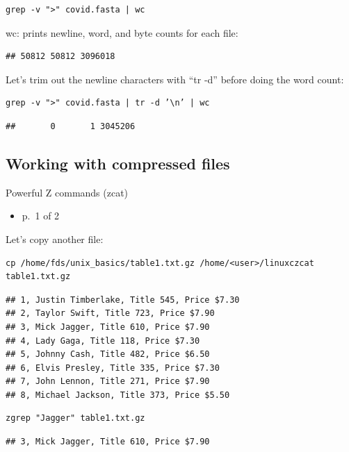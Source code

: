 \documentclass[
]{book}
\providecommand{\tightlist}{%
  \setlength{\itemsep}{0pt}\setlength{\parskip}{0pt}}
\begin{document}
\begin{verbatim}
grep -v ">" covid.fasta | wc
\end{verbatim}

wc: prints newline, word, and byte counts for each file:

\begin{verbatim}
## 50812 50812 3096018
\end{verbatim}

Let's trim out the newline characters with ``tr -d'' before doing the word count:

\begin{verbatim}
grep -v ">" covid.fasta | tr -d ’\n’ | wc
\end{verbatim}

\begin{verbatim}
##       0       1 3045206
\end{verbatim}

\hypertarget{working-with-compressed-files}{%
\subsection{Working with compressed files}\label{working-with-compressed-files}}

Powerful Z commands (zcat)

\begin{itemize}
\tightlist
\item
  p.~1 of 2
\end{itemize}

Let's copy another file:

\begin{verbatim}
cp /home/fds/unix_basics/table1.txt.gz /home/<user>/linuxczcat table1.txt.gz
\end{verbatim}

\begin{verbatim}
## 1, Justin Timberlake, Title 545, Price $7.30
## 2, Taylor Swift, Title 723, Price $7.90
## 3, Mick Jagger, Title 610, Price $7.90
## 4, Lady Gaga, Title 118, Price $7.30
## 5, Johnny Cash, Title 482, Price $6.50
## 6, Elvis Presley, Title 335, Price $7.30
## 7, John Lennon, Title 271, Price $7.90
## 8, Michael Jackson, Title 373, Price $5.50
\end{verbatim}

\begin{verbatim}
zgrep "Jagger" table1.txt.gz
\end{verbatim}

\begin{verbatim}
## 3, Mick Jagger, Title 610, Price $7.90
\end{verbatim}
\end{document}
